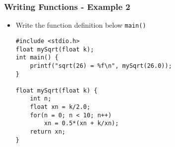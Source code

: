 \documentclass[14pt]{beamer}
\begin{document}
\begin{frame}[fragile]
\frametitle{Writing Functions - Example 2}
\begin{itemize}
\item Write the function definition below \texttt{main()}
\begin{lstlisting}[style=CStyle]
#include <stdio.h>
float mySqrt(float k);
int main() {
	printf("sqrt(26) = %f\n", mySqrt(26.0));
}

float mySqrt(float k) {
	int n;
	float xn = k/2.0;
	for(n = 0; n < 10; n++)
		xn = 0.5*(xn + k/xn);
	return xn;
}
\end{lstlisting}
\end{itemize}
\end{frame}
\end{document}
